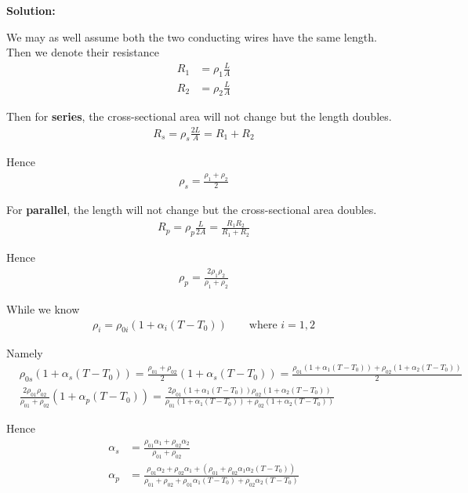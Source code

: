 \documentclass[a4paper, 11pt]{article}
\newenvironment{solution}
    {\textbf{Solution:}}
    {}
\begin{document}
\begin{solution}
	\par We may as well assume both the two conducting wires have the same length. Then we denote their resistance
	\begin{align*}
		R_1 & = \rho_{1} \frac{L}{A} \\
		R_2 & = \rho_{2} \frac{L}{A}
	\end{align*}

	Then for \textbf{series}, the cross-sectional area will not change but the length doubles.
	\begin{align*}
		R_s = \rho_s \frac{2L}{A} = R_1 + R_2
	\end{align*}

	Hence
	\begin{align}
		\label{series}
		\rho_s = \frac{\rho_{1} + \rho_{2}}{2}
	\end{align}

	For \textbf{parallel}, the length will not change but the cross-sectional area doubles.
	\begin{align*}
		R_p = \rho_p \frac{L}{2A} = \frac{R_1R_2}{R_1+R_2}
	\end{align*}

	Hence
	\begin{align}
		\rho_p = \frac{2\rho_{1}\rho_{2}}{\rho_{1} + \rho_{2}}
	\end{align}

	While we know
	\begin{align}
		\rho_i = \rho_{0i}(1 + \alpha_i(T - T_0)) \qquad \text{where } i = 1,2
	\end{align}

	Namely
	\begin{align*}
		 & \rho_{0s}(1+\alpha_s(T-T_0)) = \frac{\rho_{01} + \rho_{02}}{2}(1+\alpha_s(T-T_0)) = \frac{\rho_{01}(1+\alpha_1(T-T_0)) + \rho_{02}(1+\alpha_2(T-T_0))}{2}                                        \\
		 & \frac{2\rho_{01}\rho_{02}}{\rho_{01}+\rho_{02}}(1+\alpha_p(T-T_0)) = \frac{2\rho_{01}(1+\alpha_1(T-T_0))\rho_{02}(1+\alpha_2(T-T_0))}{\rho_{01}(1+\alpha_1(T-T_0))+\rho_{02}(1+\alpha_2(T-T_0))}
	\end{align*}

	Hence
	\begin{align}
		\alpha_s & = \frac{\rho_{01}\alpha_1 + \rho_{02}\alpha_2}{\rho_{01} + \rho_{02}}                                                                                            \\
		\alpha_p & = \frac{\rho_{01}\alpha_2+\rho_{02}\alpha_1+(\rho_{01}+\rho_{02}\alpha_1\alpha_2(T-T_0))}{\rho_{01}+\rho_{02}+\rho_{01}\alpha_1(T-T_0)+\rho_{02}\alpha_2(T-T_0)}
	\end{align}

\end{solution}
\end{document}
